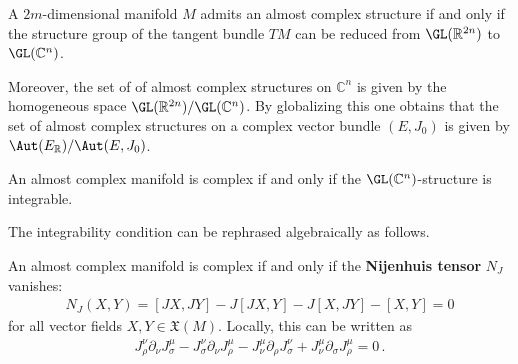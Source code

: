     \begin{property}
        A $2m$-dimensional manifold $M$ admits an almost complex structure if and only if the structure group of the tangent bundle $TM$ can be reduced from $\GL(\mathbb{R}^{2n})$ to $\GL(\mathbb{C}^n)$.

        Moreover, the set of of almost complex structures on $\mathbb{C}^n$ is given by the homogeneous space $\GL(\mathbb{R}^{2n})/\GL(\mathbb{C}^n)$. By globalizing this one obtains that the set of almost complex structures on a complex vector bundle $(E,J_0)$ is given by $\Aut(E_{\mathbb{R}})/\Aut(E,J_0)$.
    \end{property}


    \begin{property}
        An almost complex manifold is complex if and only if the $\GL(\mathbb{C}^n)$-structure is integrable.
    \end{property}
    The integrability condition can be rephrased algebraically as follows.
    \begin{theorem}
        An almost complex manifold is complex if and only if the \textbf{Nijenhuis tensor} $N_J$ vanishes:
        \begin{gather}
            \label{complex:integrable_structure}
            N_J(X,Y) = [JX,JY] - J[JX,Y] - J[X,JY] - [X,Y] = 0
        \end{gather}
        for all vector fields $X,Y\in\mathfrak{X}(M)$. Locally, this can be written as
        \begin{gather}
            J_\rho^\nu\partial_\nu J_\sigma^\mu - J_\sigma^\nu\partial_\nu J_\rho^\mu - J_\nu^\mu\partial_\rho J_\sigma^\nu + J_\nu^\mu\partial_\sigma J_\rho^\mu = 0\,.
        \end{gather}
    \end{theorem}

